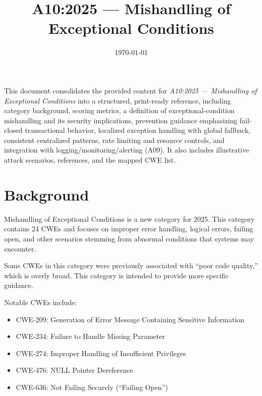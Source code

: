 \documentclass[11pt]{article}
\title{\textbf{A10:2025 — Mishandling of Exceptional Conditions}}
\date{\today}
\author{} %
\begin{document}
\maketitle

\begin{infobox}
This document consolidates the provided content for \textit{A10:2025 — Mishandling of Exceptional Conditions} into a structured, print-ready reference, including category background, scoring metrics, a definition of exceptional-condition mishandling and its security implications, prevention guidance emphasizing fail-closed transactional behavior, localized exception handling with global fallback, consistent centralized patterns, rate limiting and resource controls, and integration with logging/monitoring/alerting (A09). It also includes illustrative attack scenarios, references, and the mapped CWE list.
\end{infobox}

\tableofcontents
\newpage

\section{Background}
Mishandling of Exceptional Conditions is a new category for 2025. This category contains 24 CWEs and focuses on improper error handling, logical errors, failing open, and other scenarios stemming from abnormal conditions that systems may encounter.

Some CWEs in this category were previously associated with ``poor code quality,'' which is overly broad. This category is intended to provide more specific guidance.

Notable CWEs include:
\begin{itemize}
  \item CWE-209: Generation of Error Message Containing Sensitive Information
  \item CWE-234: Failure to Handle Missing Parameter
  \item CWE-274: Improper Handling of Insufficient Privileges
  \item CWE-476: NULL Pointer Dereference
  \item CWE-636: Not Failing Securely (``Failing Open'')
\end{itemize}
\end{document}

